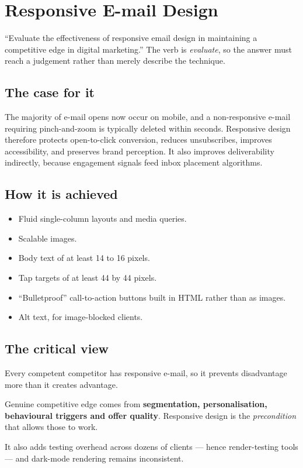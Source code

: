 \section{Responsive E-mail Design}

\begin{keybox}
``Evaluate the effectiveness of responsive email design in maintaining a
competitive edge in digital marketing.''
The verb is \emph{evaluate}, so the answer must reach a judgement rather than
merely describe the technique.
\end{keybox}

\subsection{The case for it}

The majority of e-mail opens now occur on mobile, and a non-responsive e-mail
requiring pinch-and-zoom is typically deleted within seconds. Responsive design
therefore protects open-to-click conversion, reduces unsubscribes, improves
accessibility, and preserves brand perception. It also improves deliverability
indirectly, because engagement signals feed inbox placement algorithms.

\subsection{How it is achieved}

\begin{itemize}
\item Fluid single-column layouts and media queries.
\item Scalable images.
\item Body text of at least 14 to 16 pixels.
\item Tap targets of at least 44 by 44 pixels.
\item ``Bulletproof'' call-to-action buttons built in HTML rather than as images.
\item Alt text, for image-blocked clients.
\end{itemize}

\subsection{The critical view}

\begin{warnbox}
Every competent competitor has responsive e-mail, so it prevents disadvantage
more than it creates advantage.

\smallskip
Genuine competitive edge comes from \textbf{segmentation, personalisation,
behavioural triggers and offer quality}. Responsive design is the
\emph{precondition} that allows those to work.

\smallskip
It also adds testing overhead across dozens of clients --- hence render-testing
tools --- and dark-mode rendering remains inconsistent.
\end{warnbox}

